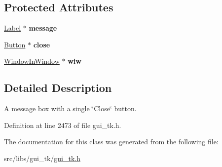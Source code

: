 \subsection*{Protected Attributes}
\begin{DoxyCompactItemize}
\item 
\hypertarget{classGUI_1_1MessageBox2_ad92a769376304d84d69e90614b2b64d8}{\hyperlink{classGUI_1_1Label}{Label} $\ast$ {\bfseries message}}\label{classGUI_1_1MessageBox2_ad92a769376304d84d69e90614b2b64d8}

\item 
\hypertarget{classGUI_1_1MessageBox2_ab17891fbe30f8b0f2f51038c9b1e2dbe}{\hyperlink{classGUI_1_1Button}{Button} $\ast$ {\bfseries close}}\label{classGUI_1_1MessageBox2_ab17891fbe30f8b0f2f51038c9b1e2dbe}

\item 
\hypertarget{classGUI_1_1MessageBox2_a065b16755f7b624cdf5e23b2ad4daeac}{\hyperlink{classGUI_1_1WindowInWindow}{Window\-In\-Window} $\ast$ {\bfseries wiw}}\label{classGUI_1_1MessageBox2_a065b16755f7b624cdf5e23b2ad4daeac}

\end{DoxyCompactItemize}


\subsection{Detailed Description}
A message box with a single \char`\"{}\-Close\char`\"{} button. 

Definition at line 2473 of file gui\-\_\-tk.\-h.



The documentation for this class was generated from the following file\-:\begin{DoxyCompactItemize}
\item 
src/libs/gui\-\_\-tk/\hyperlink{gui__tk_8h}{gui\-\_\-tk.\-h}\end{DoxyCompactItemize}

